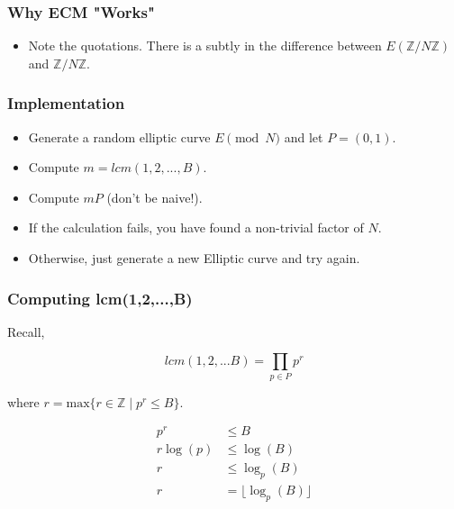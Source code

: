 \documentclass{beamer}
\begin{document}
\begin{frame}
\frametitle{Why ECM "Works"}


\begin{itemize}
\item<3-> Note the quotations. There is a subtly in the difference between $E(\mathbb{Z}/N\mathbb{Z})$ and $\mathbb{Z}/N\mathbb{Z}$.
\end{itemize}
\end{frame}

\begin{frame}
\frametitle{Implementation}

\begin{itemize}
    \item Generate a random elliptic curve $E \pmod{N}$ and let $P = (0,1)$.
    \item Compute $m = lcm(1,2,...,B)$.
    \item Compute $mP$ (don't be naive!).
    \item If the calculation fails, you have found a non-trivial factor of $N$.
    \item Otherwise, just generate a new Elliptic curve and try again.
\end{itemize}

\end{frame}

\begin{frame}
\frametitle{Computing lcm(1,2,...,B)}

Recall,

\[ lcm(1,2,...B) = \prod_{p \in P} p^r \]

where $r = \text{max} \{ r \in \mathbb{Z} \mid p^r \leq B \}$.

\begin{align*}
    p^r &\leq B \\
    r\log(p) &\leq \log(B) \\
    r &\leq \log_p(B) \\
    r &= \lfloor \log_p(B) \rfloor \\
\end{align*}

\end{frame}
\end{document}
